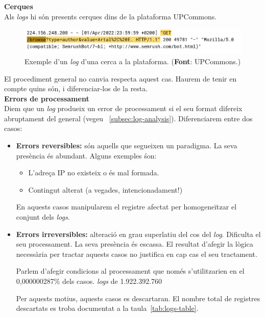 \clearpage

\noindent
\textbf{Cerques} \\

\noindent
Als \textit{\gls{log}s} hi són presents cerques dins de la plataforma \gls{UPCommons}. \\

\begin{figure}[htbp]
    \centerline{\includegraphics[width=\textwidth]{figures/log-search}}
    \captionsetup{justification=centering}
    \caption{Exemple d'un \textit{\gls{log}} d'una cerca a la plataforma. (\textbf{Font}: \gls{UPCommons}.)}\label{fig:log-search}
\end{figure}

\noindent
El procediment general no canvia respecta aquest cas.
Haurem de tenir en compte quins són, i diferenciar-los de la resta. \\

\noindent
\textbf{Errors de processament}\label{subsubsection:log-errors} \\

\noindent
Diem que un \textit{\gls{log}} produeix un error de processament si el seu format difereix abruptament del general (vegeu ~\ref{subsec:log-analysis}).
Diferenciarem entre dos casos:

\begin{itemize}
    \item \textbf{Errors reversibles:} són aquells que segueixen un paradigma.
    La seva presència és abundant.
    Alguns exemples śon:
    \begin{itemize}
        \item L'adreça \gls{IP} no existeix o és mal formada.
        \item Contingut alterat (a vegades, intencionadament!)
    \end{itemize}
    En aquests casos manipularem el registre afectat per homogeneïtzar el conjunt dels \textit{logs}.
    \item \textbf{Errors irreversibles:} alteració en grau superlatiu del cos del \textit{log}.
    Dificulta el seu processament.
    La seva presència és escassa.
    El resultat d'afegir la lògica necessària per tractar aquests casos no justifica en cap cas el seu tractament.

    \begin{tcolorbox}[colback=green!5!white, colframe=green!50!black, title=No val la pena]\label{tcbox:no-val-la-pena}
    Parlem d'afegir condicions al processament que només s'utilitzarien en el 0,000000287\% dels casos.
     \textit{\gls{log}s} de 1.922.392.760
    \end{tcolorbox}

    Per aquests motius, aquests casos es descartaran.
    El nombre total de registres descartats es troba documentat a la taula~\ref{tab:logs-table}.
\end{itemize}

